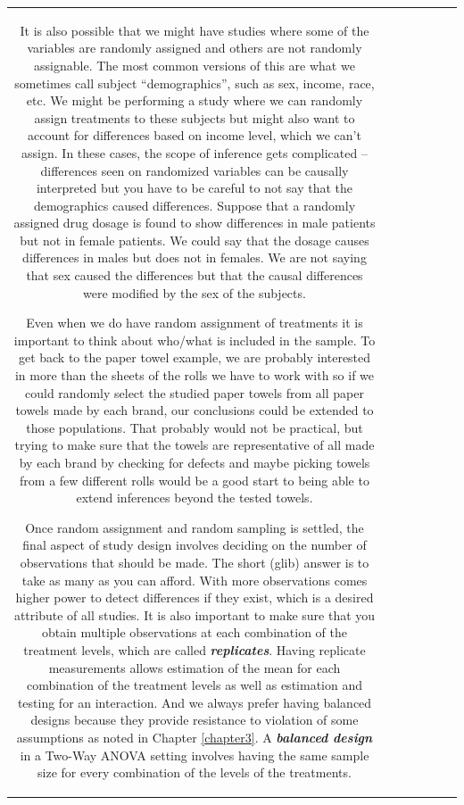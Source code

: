 \documentclass[]{book}
\theoremstyle{definition}
\theoremstyle{definition}
\theoremstyle{remark}
\begin{document}
\begin{longtable}[]{@{}ccccccc@{}}
\begin{minipage}[b]{0.10\columnwidth}
It is also possible that we might have studies where some of the
variables are randomly assigned and others are not randomly assignable.
The most common versions of this are what we sometimes call subject
``demographics'', such as sex, income, race, etc. We might be performing
a study where we can randomly assign treatments to these subjects but
might also want to account for differences based on income level, which
we can't assign. In these cases, the scope of inference gets complicated
-- differences seen on randomized variables can be causally interpreted
but you have to be careful to not say that the demographics caused
differences. Suppose that a randomly assigned drug dosage is found to
show differences in male patients but not in female patients. We could
say that the dosage causes differences in males but does not in females.
We are not saying that sex caused the differences but that the causal
differences were modified by the sex of the subjects.

Even when we do have random assignment of treatments it is important to
think about who/what is included in the sample. To get back to the paper
towel example, we are probably interested in more than the sheets of the
rolls we have to work with so if we could randomly select the studied
paper towels from all paper towels made by each brand, our conclusions
could be extended to those populations. That probably would not be
practical, but trying to make sure that the towels are representative of
all made by each brand by checking for defects and maybe picking towels
from a few different rolls would be a good start to being able to extend
inferences beyond the tested towels.

Once random assignment and random sampling is settled, the final aspect
of study design involves deciding on the number of observations that
should be made. The short (glib) answer is to take as many as you can
afford. With more observations comes higher power to detect differences
if they exist, which is a desired attribute of all studies. It is also
important to make sure that you obtain multiple observations at each
combination of the treatment levels, which are called
\textbf{\emph{replicates}}. Having replicate measurements allows
estimation of the mean for each combination of the treatment levels as
well as estimation and testing for an interaction. And we always prefer
having balanced designs because they provide resistance to violation of
some assumptions as noted in Chapter \ref{chapter3}. A
\textbf{\emph{balanced design}} in a Two-Way ANOVA setting involves
having the same sample size for every combination of the levels of the
treatments.


\end{minipage}
\end{longtable}
\end{document}
